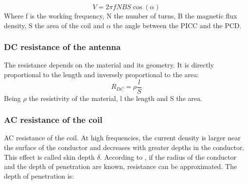 \documentclass[a4paper, 10pt, conference]{ieeeconf}      %
\begin{document}
\begin{equation}
{V = 2 \pi fNBS\cos(\alpha)}
\end{equation}
Where f is the working frequency, N the number of turns, B the magnetic flux density, S the area of the coil and $\alpha$ the angle between the PICC and the PCD.


\subsubsection{DC resistance of the antenna}
The resistance depends on the material and its geometry. It is directly proportional to the length and inversely proportional to the area:
\begin{equation}
{R_{DC} = \rho \frac{l}{S}}
\end{equation}
\newline
Being $\rho$  the resistivity of the material, l the length and S the area.




\subsubsection{AC resistance of the coil}
AC resistance of the coil. At high frequencies, the current density is larger near the surface of the conductor and decreases with greater depths in the conductor. This effect is called skin depth $\delta$.
According to  \cite{c9}, if the radius of the conductor and the depth of penetration are known, resistance can be approximated. The depth of penetration is:
\end{document}
